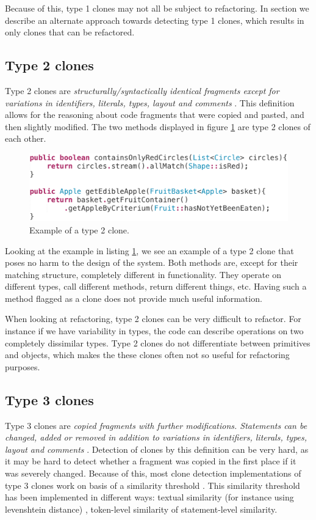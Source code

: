 \documentclass[a4paper]{article}
\begin{document}
Because of this, type 1 clones may not all be subject to refactoring. In section \label{chap:type1rclones} we describe an alternate approach towards detecting type 1 clones, which results in only clones that can be refactored.

\subsection{Type 2 clones}
Type 2 clones are \textit{structurally/syntactically identical fragments except for variations in identifiers, literals, types, layout and comments} \cite{roy2007survey}. This definition allows for the reasoning about code fragments that were copied and pasted, and then slightly modified. The two methods displayed in figure \ref{fig:type2} are type 2 clones of each other.

\begin{figure}[H]
  \includegraphics[width=1\columnwidth]{img/type2}
  \caption{Example of a type 2 clone.}
  \label{fig:type2}
\end{figure}

Looking at the example in listing \ref{fig:type2}, we see an example of a type 2 clone that poses no harm to the design of the system. Both methods are, except for their matching structure, completely different in functionality. They operate on different types, call different methods, return different things, etc. Having such a method flagged as a clone does not provide much useful information.

When looking at refactoring, type 2 clones can be very difficult to refactor. For instance if we have variability in types, the code can describe operations on two completely dissimilar types. Type 2 clones do not differentiate between primitives and objects, which makes the these clones often not so useful for refactoring purposes.

\subsection{Type 3 clones}
Type 3 clones are \textit{copied fragments with further modifications. Statements can be changed, added or removed in addition to variations in identifiers, literals, types, layout and comments} \cite{roy2007survey}. Detection of clones by this definition can be very hard, as it may be hard to detect whether a fragment was copied in the first place if it was severely changed. Because of this, most clone detection implementations of type 3 clones work on basis of a similarity threshold \cite{svajlenko2014evaluating, cordy2011nicad}. This similarity threshold has been implemented in different ways: textual similarity (for instance using levenshtein distance) \cite{lavoie2011automated}, token-level similarity of statement-level similarity.
\end{document}

